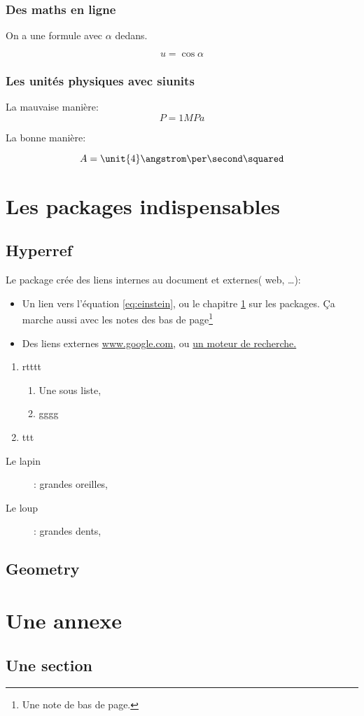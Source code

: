 \documentclass[twoside, twocolumn, a4paper]{book}
\begin{document}
\subsection{Des maths en ligne}
On a une formule avec $\alpha$ dedans. 

$$
u = \cos \alpha
$$

\subsection{Les unités physiques avec siunits}

La mauvaise manière:
$$
P = 1MPa
$$

La bonne manière:

$$
A = \unit{4}\angstrom\per\second\squared 
$$

\chapter{Les packages indispensables}
\label{chap:packages}

\section{Hyperref}

Le package crée des liens internes au document et externes( web, \ldots):
\begin{itemize}
\item Un lien vers l'équation \ref{eq:einstein}, ou le chapitre \ref{chap:packages} sur les packages. Ça marche aussi avec les notes des bas de page\footnote{Une note de bas de page.}
\item Des liens externes \url{www.google.com}, ou \href{www.google.com}{un moteur de recherche.}
\end{itemize}

\begin{enumerate}
\item rtttt
  \begin{enumerate}
  \item Une sous liste,
  \item gggg
  \end{enumerate}
\item ttt
\end{enumerate}

\begin{description}
\item[Le lapin]: grandes oreilles,
\item[Le loup]: grandes dents,
\end{description}

\section{Geometry}



\backmatter
\appendix %
\chapter{Une annexe}
\section{Une section}
\end{document}
